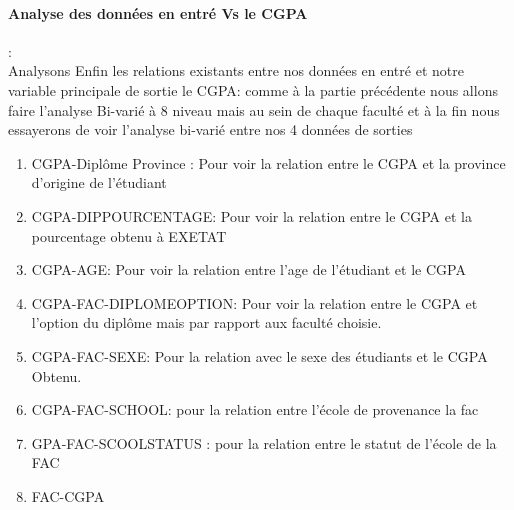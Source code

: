 \paragraph{Analyse des données en entré Vs le CGPA}:\\
Analysons Enfin les relations existants entre nos données en entré et notre variable principale de sortie le \ac{CGPA}: 
comme à la partie précédente nous allons faire l'analyse Bi-varié à
8 niveau mais au sein de chaque faculté et à la fin nous essayerons de voir l'analyse bi-varié entre nos 4 données de sorties
\begin{enumerate}
	\item CGPA-Diplôme Province : Pour voir la relation entre le CGPA
	et la province d'origine de l'étudiant
	\item CGPA-DIPPOURCENTAGE: Pour voir
	la relation entre le CGPA et la pourcentage obtenu à \ac{EXETAT}
	\item CGPA-AGE: Pour voir la relation entre l'age de l'étudiant et le CGPA
	\item CGPA-FAC-DIPLOMEOPTION: Pour voir la relation entre le CGPA et l'option
	du diplôme mais par rapport aux faculté choisie.
	\item CGPA-FAC-SEXE: Pour
	la relation avec le sexe des étudiants et le CGPA Obtenu.
	\item  CGPA-FAC-SCHOOL: pour la relation entre l'école de provenance la fac 
	\item GPA-FAC-SCOOLSTATUS : pour la relation entre le statut de l'école de la
	FAC 
	\item FAC-CGPA
\end{enumerate}

